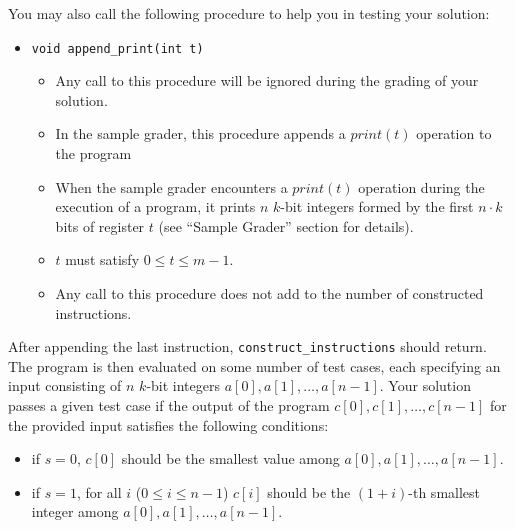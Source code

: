 You may also call the following procedure to help you in testing your solution:

\begin{itemize}
\item \texttt{void append\_print(int t)}
\begin{itemize}
\item Any call to this procedure will be ignored during the grading of your solution.
\item In the sample grader, this procedure appends a $print(t)$ operation to the program
\item When the sample grader encounters a $print(t)$ operation during the execution of a program, it
prints $n$ $k$-bit integers formed by the first $n \cdot k$ bits of register $t$ (see ``Sample Grader'' section
for details).
\item $t$ must satisfy $0 \leq t \leq m-1$.
\item Any call to this procedure does not add to the number of constructed instructions.
\end{itemize}
\end{itemize}

After appending the last instruction, \texttt{construct\_instructions} should return. The program is then
evaluated on some number of test cases, each specifying an input consisting of $n$ $k$-bit integers $a[0], a[1], \ldots, a[n-1]$.
Your solution passes a given test case if the output of the program $c[0], c[1], \ldots, c[n-1]$  for the provided input satisfies the following conditions:
\begin{itemize}
\item if $s = 0$, $c[0]$ should be the smallest value among $a[0], a[1], \ldots, a[n-1]$.
\item if $s = 1$, for all $i$ ($0\leq i\leq n-1$) $c[i]$ should be the $(1+i)$-th smallest integer among $a[0],a[1],\ldots, a[n-1]$.
\end{itemize}

